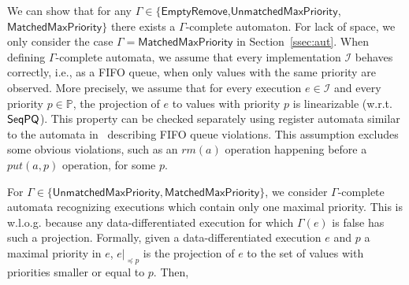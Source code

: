 \documentclass[a4paper,UKenglish]{lipics-v2016}
\begin{document}
We can show that for any $\Gamma\in \{\mathsf{EmptyRemove}$,$\mathsf{UnmatchedMaxPriority}$,$\mathsf{MatchedMaxPriority}\}$ there exists a $\Gamma$-complete automaton. For lack of space, we only consider the case $\Gamma=\mathsf{MatchedMaxPriority}$ in 
Section~\ref{ssec:aut}.
When defining $\Gamma$-complete automata, we assume that every implementation $\mathcal{I}$ behaves correctly, i.e., as a FIFO queue, when only values with the same priority are observed. More precisely, we assume that for every execution $e\in\mathcal{I}$ and every priority $p\in\mathbb{P}$, the projection of $e$ to values with priority $p$ is linearizable (w.r.t. $\mathsf{SeqPQ}$). This property can be checked separately using register automata similar to the automata in~\cite{DBLP:conf/icalp/BouajjaniEEH15} describing FIFO queue violations. 
This assumption excludes some obvious violations, such as an $\textit{rm}(a)$ operation happening before a $\textit{put}(a,p)$ operation, for some $p$.

For $\Gamma\in \{\mathsf{UnmatchedMaxPriority}, \mathsf{MatchedMaxPriority}\}$, we consider $\Gamma$-complete automata recognizing executions which contain only one maximal priority. This is w.l.o.g. because any data-differentiated execution for which $\Gamma(e)$ is false has such a projection.
Formally, given a data-differentiated execution $e$ and $p$ a maximal priority in $e$, $e\vert_{\preceq p}$ is the projection of $e$ to the set of values with priorities smaller or equal to $p$. Then,
\end{document}
